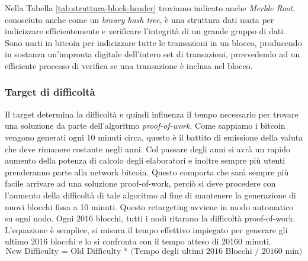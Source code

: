 Nella Tabella \ref{tab:struttura-block-header} troviamo indicato anche \textit{Merkle Root}, conosciuto anche come un \textit{binary hash tree}, è una struttura dati usata per indicizzare efficientemente e verificare l'integrità di un grande gruppo di dati. Sono usati in bitcoin per indicizzare tutte le transazioni in un blocco, producendo in sostanza un'impronta digitale dell'intero set di transazioni, provvedendo ad un efficiente processo di verifica se una transazione è inclusa nel blocco. 

\subsubsection{Target di difficoltà}
Il target determina la difficoltà e quindi influenza il tempo necessario per trovare una soluzione da parte dell'algoritmo \textit{proof-of-work}. Come sappiamo i bitcoin vengono generati ogni 10 minuti circa, questo è il battito di emissione della valuta che deve rimanere costante negli anni. Col passare degli anni si avrà un rapido aumento della potenza di calcolo degli elaboratori e inoltre sempre più utenti prenderanno parte alla network bitcoin. Questo comporta che sarà sempre più facile arrivare ad una soluzione proof-of-work, perciò si deve procedere con l'aumento della difficoltà di tale algoritmo al fine di mantenere la generazione di nuovi blocchi fissa a 10 minuti. Questo retargeting avviene in modo automatico su ogni nodo. Ogni 2016 blocchi, tutti i nodi ritarano la difficoltà proof-of-work. L'equazione è semplice, si misura il tempo effettivo impiegato per generare gli ultimo 2016 blocchi e lo si confronta con il tempo atteso di 20160 minuti. 
\[ \text{New Difficulty = Old Difficulty * (Tempo degli ultimi 2016 Blocchi / 20160 min)} \]

